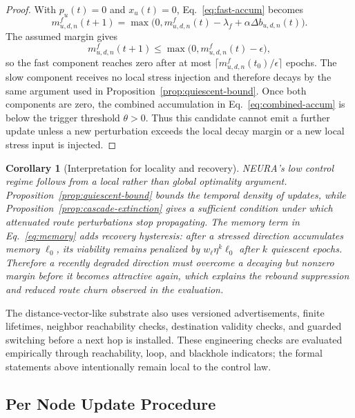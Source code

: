 \documentclass[5p,times]{elsarticle}
\newtheorem{corollary}{Corollary}
\begin{document}
\begin{proof}
With $p_u(t)=0$ and $x_u(t)=0$, Eq.~\eqref{eq:fast-accum} becomes
\begin{equation}
m^{f}_{u,d,n}(t+1)
=
\max\big(0,m^{f}_{u,d,n}(t)-\lambda_f+\alpha\Delta b_{u,d,n}(t)\big).
\end{equation}
The assumed margin gives
\begin{equation}
m^{f}_{u,d,n}(t+1)
\le
\max\big(0,m^{f}_{u,d,n}(t)-\epsilon\big),
\end{equation}
so the fast component reaches zero after at most
$\lceil m^{f}_{u,d,n}(t_0)/\epsilon\rceil$ epochs. The slow component receives no local stress injection and therefore decays by the same argument used in Proposition~\ref{prop:quiescent-bound}. Once both components are zero, the combined accumulation in Eq.~\eqref{eq:combined-accum} is below the trigger threshold $\theta>0$. Thus this candidate cannot emit a further update unless a new perturbation exceeds the local decay margin or a new local stress input is injected.
\end{proof}

\begin{corollary}[Interpretation for locality and recovery]
\label{cor:locality-recovery}
NEURA's low control regime follows from a local rather than global optimality argument. Proposition~\ref{prop:quiescent-bound} bounds the temporal density of updates, while Proposition~\ref{prop:cascade-extinction} gives a sufficient condition under which attenuated route perturbations stop propagating. The memory term in Eq.~\eqref{eq:memory} adds recovery hysteresis: after a stressed direction accumulates memory $\ell_0$, its viability remains penalized by $w_\ell\eta^k\ell_0$ after $k$ quiescent epochs. Therefore a recently degraded direction must overcome a decaying but nonzero margin before it becomes attractive again, which explains the rebound suppression and reduced route churn observed in the evaluation.
\end{corollary}

The distance-vector-like substrate also uses versioned advertisements, finite lifetimes, neighbor reachability checks, destination validity checks, and guarded switching before a next hop is installed. These engineering checks are evaluated empirically through reachability, loop, and blackhole indicators; the formal statements above intentionally remain local to the control law.

\subsection{Per Node Update Procedure}
\end{document}
